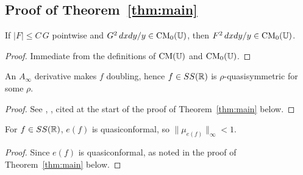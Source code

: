 \subsection{Proof of Theorem~\ref{thm:main}}\label{ss:proof-main}

\begin{lemma}\label{lem:isVanishingCarleson_of_le}
	\leanok
	If $|F|\le C\,G$ pointwise and $G^2\,dxdy/y\in\mathrm{CM}_0(\mathbb{U})$, then $F^2\,dxdy/y\in\mathrm{CM}_0(\mathbb{U})$.
\end{lemma}
\begin{proof}
	Immediate from the definitions of $\mathrm{CM}(\mathbb{U})$ and $\mathrm{CM}_0(\mathbb{U})$.
\end{proof}

\begin{lemma}\label{lem:ainfty_imp_quasisymmetric}
	An $A_\infty$ derivative makes $f$ doubling, hence $f\in SS(\mathbb{R})$ is $\rho$-quasisymmetric for some $\rho$.
\end{lemma}
\begin{proof}
	See \cite{Jon}, \cite{HS}, cited at the start of the proof of Theorem~\ref{thm:main} below.
\end{proof}

\begin{lemma}\label{lem:ss_dilatation_sup_lt_one}
	For $f\in SS(\mathbb{R})$, $e(f)$ is quasiconformal, so $\|\mu_{e(f)}\|_\infty<1$.
\end{lemma}
\begin{proof}
	Since $e(f)$ is quasiconformal, as noted in the proof of Theorem~\ref{thm:main} below.
\end{proof}

